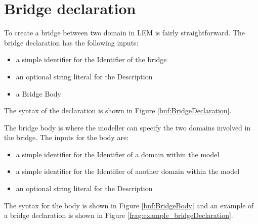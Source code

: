 
\section{Bridge declaration} \label{sec:BridgeDeclaration}
To create a bridge between two domain in LEM is fairly straightforward. The bridge declaration has the following inputs:

\begin{itemize}
\item a simple identifier for the Identifier of the bridge
\item an optional string literal for the Description
\item a Bridge Body
\end{itemize}

The syntax of the declaration is shown in Figure \ref{bnf:BridgeDeclaration}.

The bridge body is where the modeller can specify the two domains involved in the bridge. The inputs for the body are:

\begin{itemize}
\item a simple identifier for the Identifier of a domain within the model
\item a simple identifier for the Identifier of another domain within the model
\item an optional string literal for the Description
\end{itemize}

The syntax for the body is shown in Figure \ref{bnf:BridgeBody} and an example of a bridge declaration is shown in Figure \ref{frag:example_bridgeDeclaration}.


